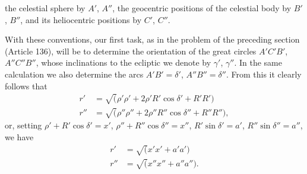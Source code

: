 the celestial sphere by $A'$, $A''$, the geocentric positions of the celestial body
by $B'$, $B''$, and its heliocentric positions by $C'$, $C''$.
\par
With these conventions, our first task, as in the problem of the preceding section
(Article 136), will be to determine the orientation of the great circles $A'C'B'$,
$A''C''B''$, whose inclinations to the ecliptic we denote by $\gamma'$, $\gamma''$. In the same
calculation we also determine the arcs $A'B'=\delta'$, $A''B''=\delta''$. From this
it clearly follows that
\[
\begin{aligned}
r'&=\surd(\rho'\rho'+2\rho'R'\cos\delta'+R'R')\\
r''&=\surd(\rho''\rho''+2\rho''R''\cos\delta''+R''R''),
\end{aligned}
\]
\noindent or, setting $\rho'+R'\cos\delta'=x'$, $\rho''+R''\cos\delta''=x''$,
$R'\sin\delta'=a'$, $R''\sin\delta''=a''$, we have
\[
\begin{aligned}
r'&=\surd(x'x'+a'a')\\
r''&=\surd(x''x''+a''a'').
\end{aligned}
\]

